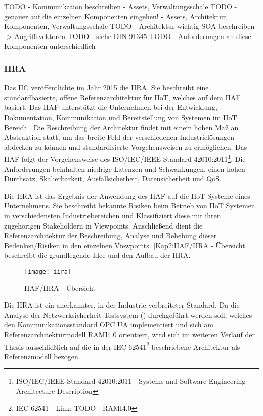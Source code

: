TODO - Kommunikation beschreiben - Assets, Verwaltungsschale
TODO - genauer auf die einzelnen Komponenten eingehen! - Assets, Architektur, Komponenten, Verwaltungsschale
TODO - Architektur wichtig SOA beschreiben -> Angriffsvektoren
TODO - siehe DIN 91345
TODO - Anforderungen an diese Komponenten unterschiedlich

\subsubsection{IIRA}
Das \ac{IIC} veröffentlichte im Jahr 2015 die \ac{IIRA}. Sie beschreibt eine standardbasierte, offene Referenzarchitektur für \ac{IIoT}, welches auf dem \ac{IIAF} basiert. Das \ac{IIAF} unterstützt die Unternehmen bei der Entwicklung, Dokumentation, Kommunikation und Bereitstellung von Systemen im \ac{IIoT} Bereich \cite{iira2017}. Die Beschreibung der Architektur findet mit einem hohen Maß an Abstraktion statt, um das breite Feld der verschiedenen Industrielösungen abdecken zu können und standardisierte Vorgehensweisen zu ermöglichen. Das \ac{IIAF} folgt der Vorgehensweise des ISO/IEC/IEEE Standard 42010:2011\footnote{ISO/IEC/IEEE Standard 42010:2011 - Systems and Software Engineering–Architecture Description}. Die Anforderungen beinhalten niedrige Latenzen und Schwankungen, einen hohen Durchsatz, Skalierbarkeit, Ausfallsicherheit, Datensicherheit und \ac{QoS}.

Die \ac{IIRA} ist das Ergebnis der Anwendung des \ac{IIAF} auf die \ac{IIoT} Systeme eines Unternehmens. Sie beschreibt bekannte Risiken beim Betrieb von \ac{IIoT} Systemen in verschiedensten Industriebereichen und Klassifiziert diese mit ihren zugehörigen Stakeholdern in Viewpoints. Anschließend dient die Referenzarchitektur der Beschreibung, Analyse und Behebung dieser Bedenken/Risiken in den einzelnen Viewpoints. \autoref{Kap2:IIAF/IIRA - Übersicht} beschreibt die grundlegende Idee und den Aufbau der \ac{IIRA}.

\begin{figure}[h]
  \centering
  \texttt{[image: iira]}
  \caption{IIAF/IIRA - Übersicht} 
  \label{Kap2:IIAF/IIRA - Übersicht}
\end{figure}

\clearpage

Die \ac{IIRA} ist ein anerkannter, in der Industrie verbreiteter Standard. Da die Analyse der Netzwerksicherheit Testsystem (\cite{Weber2018}) durchgeführt werden soll, welches den Kommunikationsstandard \ac{OPC UA} implementiert und sich am Referenzarchitekturmodell \ac{RAMI4.0} orientiert, wird sich im weiteren Verlauf der Thesis ausschließlich auf die in der IEC 62541\footnote{IEC 62541 - Link: TODO - RAMI4.0} beschriebene Architektur als Referenzmodell bezogen.

